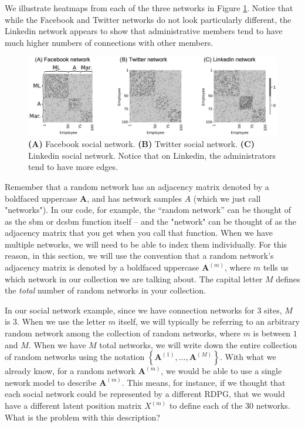 We illustrate heatmaps from each of the three networks in Figure \ref{fig:ch5:socialnets}. Notice that while the Facebook and Twitter networks do not look particularly different, the Linkedin network appears to show that administrative members tend to have much higher numbers of connections with other members.

\begin{figure}[h]
    \centering
    \includegraphics[width=\linewidth]{representations/ch5/Images/socialnets.png}
    \caption[Social networks for employees across Facebook, Twitter, and Linkedin.]{\textbf{(A)} Facebook social network. \textbf{(B)} Twitter social network. \textbf{(C)} Linkedin social network. Notice that on Linkedin, the administrators tend to have more edges.}
    \label{fig:ch5:socialnets}
\end{figure}

Remember that a random network has an adjacency matrix denoted by a boldfaced uppercase $\mathbf A$, and has network samples $A$ (which we just call "networks"). In our code, for example, the ``random network'' can be thought of as the sbm or dcsbm function itself -- and the "network" can be thought of as the adjacency matrix that you get when you call that function. When we have multiple networks, we will need to be able to index them individually. For this reason, in this section, we will use the convention that a random network's adjacency matrix is denoted by a boldfaced uppercase $\mathbf A^{(m)}$, where $m$ tells us which network in our collection we are talking about. The capital letter $M$ defines the \textit{total} number of random networks in your collection. 

In our social network example, since we have connection networks for $3$ sites, $M$ is $3$. When we use the letter $m$ itself, we will typically be referring to an arbitrary random network among the collection of random networks, where $m$ is between $1$ and $M$. When we have $M$ total networks, we will write down the entire {collection of random networks} using the notation $\left\{\mathbf A^{(1)}, ..., \mathbf A^{(M)}\right\}$. With what we already know, for a random network $\mathbf A^{(m)}$, we would be able to use a single nework model to describe $\mathbf A^{(m)}$. This means, for instance, if we thought that each social network could be represented by a different RDPG, that we would have a {different} latent position matrix $X^{(m)}$ to define each of the $30$ networks. What is the problem with this description?

